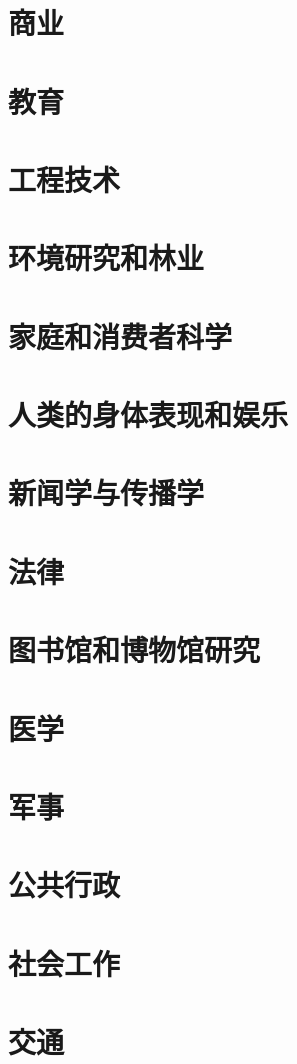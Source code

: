 \chapter{商业}

\chapter{教育}

\chapter{工程技术}

\chapter{环境研究和林业}

\chapter{家庭和消费者科学}

\chapter{人类的身体表现和娱乐}


\chapter{新闻学与传播学}

\chapter{法律}

\chapter{图书馆和博物馆研究}




\chapter{医学}

\chapter{军事}

\chapter{公共行政}

\chapter{社会工作}

\chapter{交通}

